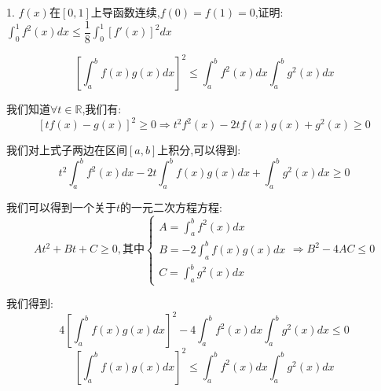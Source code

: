 1. $f(x)$在$[0,1]$上导函数连续,$f(0)=f(1)=0$,证明:  $\int_{0}^{1}f^{2}(x)dx\leq \dfrac{1}{8}\int_{0}^{1}[f'(x)]^2dx$
\begin{theorem}[积分形式柯西不等式]
	$$\left[ \int_{a}^{b}f(x)g(x)dx\right] ^2\leq \int_{a}^{b}f^2(x)dx\int_{a}^{b}g^{2}(x)dx$$
	
	我们知道$\forall t\in\mathbb{R}$,我们有:  
	$$\left[ tf(x)-g(x)\right]^2\geq 0\Rightarrow t^2f^{2}(x)-2tf(x)g(x)+g^{2}(x)\geq 0$$
	
	我们对上式子两边在区间$[a,b]$上积分,可以得到:  
	$$t^2\int_{a}^{b}f^{2}(x)dx-2t\int_{a}^{b}f(x)g(x)dx+\int_{a}^{b}g^{2}(x)dx\geq 0$$
	
	我们可以得到一个关于$t$的一元二次方程方程:  
	$$At^2+Bt+C\geq 0,\text{其中}\left\lbrace
	\begin{array}{l}
		A=\int_{a}^{b}f^{2}(x)dx\\
		B=-2\int_{a}^{b}f(x)g(x)dx\\
		C=\int_{a}^{b}g^{2}(x)dx
	\end{array}
	\right. \Rightarrow B^2-4AC\leq 0$$
	
	我们得到:  $$4\left[ \int_{a}^{b}f(x)g(x)dx\right]^2-4\int_{a}^{b}f^{2}(x)dx\int_{a}^{b}g^{2}(x)dx\leq 0 
	$$
	$$\left[ \int_{a}^{b}f(x)g(x)dx\right] ^2\leq \int_{a}^{b}f^2(x)dx\int_{a}^{b}g^{2}(x)dx$$
\end{theorem}
